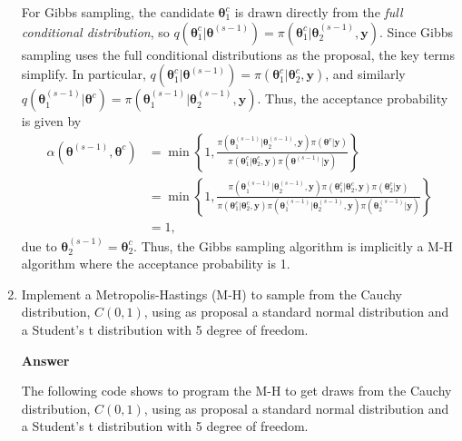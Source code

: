 \begin{enumerate}[leftmargin=*]
For Gibbs sampling, the candidate $\bm{\theta}^c_1$ is drawn directly from the \emph{full conditional distribution}, so $q(\bm{\theta}^c_1 | \bm{\theta}^{(s-1)}) = \pi(\bm{\theta}^c_1 | \bm{\theta}^{(s-1)}_2, \bm{y})$. Since Gibbs sampling uses the full conditional distributions as the proposal, the key terms simplify. In particular, $q(\bm{\theta}^c_1 | \bm{\theta}^{(s-1)}) = \pi(\bm{\theta}^c_1 | \bm{\theta}^{c}_2, \bm{y})$, and similarly $q(\bm{\theta}^{(s-1)}_1 | \bm{\theta}^c) = \pi(\bm{\theta}^{(s-1)}_1 | \bm{\theta}^{(s-1)}_2, \bm{y})$. Thus, the acceptance probability is given by 
\begin{align*}
	\alpha(\bm{\theta}^{(s-1)}, \bm{\theta}^c) & = \min\left\{ 1, \frac{\pi(\bm{\theta}^{(s-1)}_1 | \bm{\theta}_2^{(s-1)}, \bm{y}) \pi(\bm{\theta}^c | \bm{y})}{\pi(\bm{\theta}^c_1 | \bm{\theta}^{c}_2, \bm{y}) \pi(\bm{\theta}^{(s-1)} | \bm{y})} \right\}\\
	&= \min\left\{ 1, \frac{\pi(\bm{\theta}^{(s-1)}_1 | \bm{\theta}_2^{(s-1)}, \bm{y}) \pi(\bm{\theta}^c_1 | \bm{\theta}^c_2, \bm{y})\pi(\bm{\theta}^c_2 | \bm{y})}{\pi(\bm{\theta}^c_1 | \bm{\theta}^{c}_2, \bm{y}) \pi(\bm{\theta}^{(s-1)}_1 | \bm{\theta}^{(s-1)}_2, \bm{y}) \pi(\bm{\theta}^{(s-1)}_2 | \bm{y})} \right\}\\
	&=1,
\end{align*}
due to $\bm{\theta}^{(s-1)}_2=\bm{\theta}^{c}_2$. Thus, the Gibbs sampling algorithm is implicitly a M-H algorithm where the acceptance probability is 1.

\item Implement a Metropolis-Hastings (M-H) to sample from the Cauchy distribution, $C(0,1)$, using as proposal a standard normal distribution and a Student's t distribution with 5 degree of freedom. 

\textbf{Answer}

The following code shows to program the M-H to get draws from the Cauchy distribution, $C(0,1)$, using as proposal a standard normal distribution and a Student's t distribution with 5 degree of freedom.


\end{enumerate}
